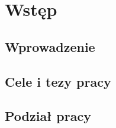 \chapter{Wstęp}
\section{Wprowadzenie}

\section{Cele i tezy pracy}

\section{Podział pracy}











